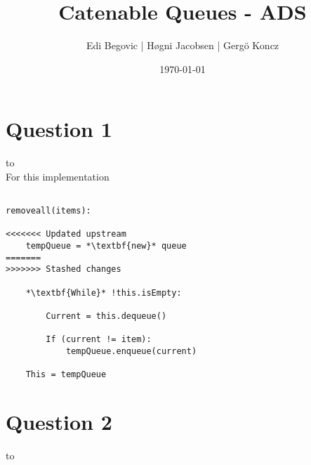 \documentclass[a4paper]{article}
\title{Catenable Queues - ADS}
\author{Edi Begovic | Høgni Jacobsen | Gergö Koncz}
\date{\today}
\def\headline#1{\hbox to \hsize{\hrulefill\quad\lower.3em\hbox{#1}\quad\hrulefill}}
\begin{document}
 
\maketitle

\section*{Question 1}
\headline{-} \ \\

\noindent
For this implementation 

\begin{lstlisting}[escapeinside={{*}{*}}]

removeall(items):

<<<<<<< Updated upstream
    tempQueue = *\textbf{new}* queue
=======
>>>>>>> Stashed changes

    *\textbf{While}* !this.isEmpty:

        Current = this.dequeue()
        
        If (current != item):
            tempQueue.enqueue(current)
    
    This = tempQueue

\end{lstlisting}

\section*{Question 2}
\headline{-} \ \\
\end{document}
